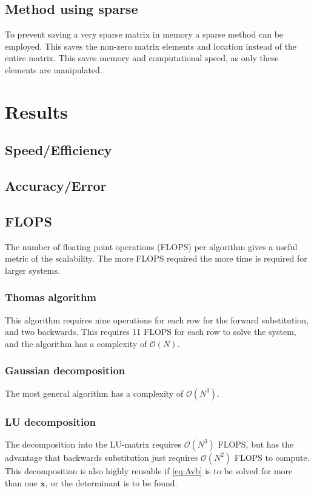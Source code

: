 \documentclass[11pt,a4paper,english,draft]{article}
\numberwithin{equation}{section}
\newcommand{\ve}[1]{\mathbf{#1}} %
\newcommand{\bigO}[1]{\mathcal{O}\left( #1 \right)}
\begin{document}
\subsection{Method using sparse}

To prevent saving a very sparse matrix in memory a sparse method can be employed.
This saves the non-zero matrix elements and location instead of the 
entire matrix. This saves memory and computational speed, as only these
elements are manipulated.

\section{Results}

\subsection{Speed/Efficiency}

\subsection{Accuracy/Error}

\subsection{FLOPS}

The number of floating point operations (FLOPS) per algorithm gives a useful 
metric of the scalability. The more FLOPS required the more time is
required for larger systems.

\subsubsection{Thomas algorithm}
This algorithm requires nine operations for each row for the forward substitution,
and two backwards. This requires 11 FLOPS for each row to solve the system, and
the algorithm has a complexity of $\bigO{N}$.

\subsubsection{Gaussian decomposition}
The most general algorithm has a complexity of $\bigO{N^3}$.

\subsubsection{LU decomposition}
The decomposition into the LU-matrix requires $\bigO{N^3}$ FLOPS, but 
has the advantage that backwards substitution just requires $\bigO{N^2}$
FLOPS to compute. This decomposition is also highly reusable if \eqref{eq:Avb}
is to be solved for more than one $\ve{x}$, or the determinant is to be found.
\end{document}

